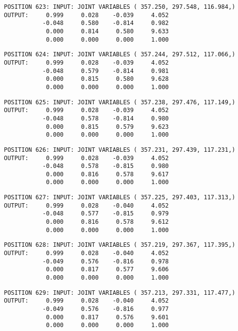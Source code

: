 \begin{verbatim}
POSITION 623: INPUT: JOINT VARIABLES ( 357.250, 297.548, 116.984,)
OUTPUT:     0.999     0.028    -0.039     4.052
           -0.048     0.580    -0.814     0.982
            0.000     0.814     0.580     9.633
            0.000     0.000     0.000     1.000
\end{verbatim} \pagebreak[1]\begin{verbatim}
POSITION 624: INPUT: JOINT VARIABLES ( 357.244, 297.512, 117.066,)
OUTPUT:     0.999     0.028    -0.039     4.052
           -0.048     0.579    -0.814     0.981
            0.000     0.815     0.580     9.628
            0.000     0.000     0.000     1.000
\end{verbatim} \pagebreak[1]\begin{verbatim}
POSITION 625: INPUT: JOINT VARIABLES ( 357.238, 297.476, 117.149,)
OUTPUT:     0.999     0.028    -0.039     4.052
           -0.048     0.578    -0.814     0.980
            0.000     0.815     0.579     9.623
            0.000     0.000     0.000     1.000
\end{verbatim} \pagebreak[1]\begin{verbatim}
POSITION 626: INPUT: JOINT VARIABLES ( 357.231, 297.439, 117.231,)
OUTPUT:     0.999     0.028    -0.039     4.052
           -0.048     0.578    -0.815     0.980
            0.000     0.816     0.578     9.617
            0.000     0.000     0.000     1.000
\end{verbatim} \pagebreak[1]\begin{verbatim}
POSITION 627: INPUT: JOINT VARIABLES ( 357.225, 297.403, 117.313,)
OUTPUT:     0.999     0.028    -0.040     4.052
           -0.048     0.577    -0.815     0.979
            0.000     0.816     0.578     9.612
            0.000     0.000     0.000     1.000
\end{verbatim} \pagebreak[1]\begin{verbatim}
POSITION 628: INPUT: JOINT VARIABLES ( 357.219, 297.367, 117.395,)
OUTPUT:     0.999     0.028    -0.040     4.052
           -0.049     0.576    -0.816     0.978
            0.000     0.817     0.577     9.606
            0.000     0.000     0.000     1.000
\end{verbatim} \pagebreak[1]\begin{verbatim}
POSITION 629: INPUT: JOINT VARIABLES ( 357.213, 297.331, 117.477,)
OUTPUT:     0.999     0.028    -0.040     4.052
           -0.049     0.576    -0.816     0.977
            0.000     0.817     0.576     9.601
            0.000     0.000     0.000     1.000
\end{verbatim} \pagebreak[1]\begin{verbatim}

\end{verbatim}
